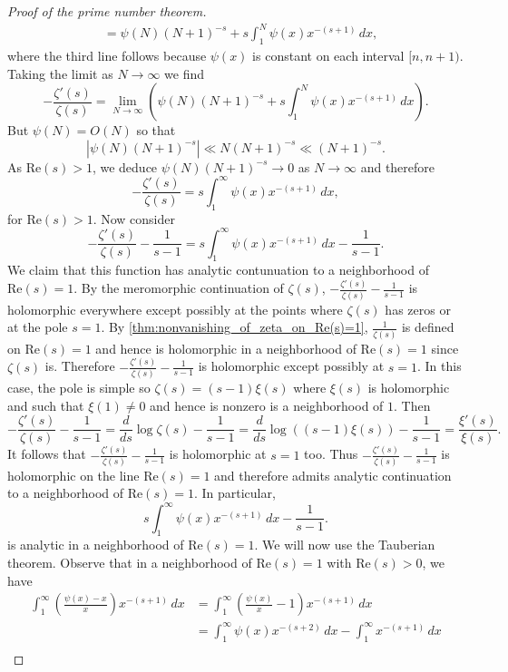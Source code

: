 \documentclass[12pt]{book}
\theoremstyle{definition}\newframedtheorem{method}{Method}
\newcommand{\z}{\zeta}
\newcommand{\<}{\langle}
\renewcommand{\>}{\rangle}
\renewcommand{\Re}{\mathrm{Re}}
\begin{document}
\begin{proof}[Proof of the prime number theorem]
\begin{align*}
          &= \psi(N)(N+1)^{-s}+s\int_{1}^{N}\psi(x)x^{-(s+1)}\,dx,
        \end{align*}
        where the third line follows because $\psi(x)$ is constant on each interval $[n,n+1)$. Taking the limit as $N \to \infty$ we find
        \[
          -\frac{\z'(s)}{\z(s)} = \lim_{N \to \infty}\left(\psi(N)(N+1)^{-s}+s\int_{1}^{N}\psi(x)x^{-(s+1)}\,dx\right).
        \]
        But $\psi(N) = O(N)$ so that
        \[
          |\psi(N)(N+1)^{-s}| \ll N(N+1)^{-s} \ll (N+1)^{-s}.
        \]
        As $\Re(s) > 1$, we deduce $\psi(N)(N+1)^{-s} \to 0$ as $N \to \infty$ and therefore
        \[
          -\frac{\z'(s)}{\z(s)} = s\int_{1}^{\infty}\psi(x)x^{-(s+1)}\,dx,
        \]
        for $\Re(s) > 1$. Now consider
        \[
          -\frac{\z'(s)}{\z(s)}-\frac{1}{s-1} = s\int_{1}^{\infty}\psi(x)x^{-(s+1)}\,dx-\frac{1}{s-1}.
        \]
        We claim that this function has analytic contunuation to a neighborhood of $\Re(s) = 1$. By the meromorphic continuation of $\z(s)$, $-\frac{\z'(s)}{\z(s)}-\frac{1}{s-1}$ is holomorphic everywhere except possibly at the points where $\z(s)$ has zeros or at the pole $s = 1$. By \cref{thm:nonvanishing_of_zeta_on_Re(s)=1}, $\frac{1}{\z(s)}$ is defined on $\Re(s) = 1$ and hence is holomorphic in a neighborhood of $\Re(s) = 1$ since $\z(s)$ is. Therefore $-\frac{\z'(s)}{\z(s)}-\frac{1}{s-1}$ is holomorphic except possibly at $s = 1$. In this case, the pole is simple so $\z(s) = (s-1)\xi(s)$ where $\xi(s)$ is holomorphic and such that $\xi(1) \neq 0$ and hence is nonzero is a neighborhood of $1$. Then
        \[
          -\frac{\z'(s)}{\z(s)}-\frac{1}{s-1} = \frac{d}{ds}\log\z(s)-\frac{1}{s-1} = \frac{d}{ds}\log((s-1)\xi(s))-\frac{1}{s-1} = \frac{\xi'(s)}{\xi(s)}.
        \]
        It follows that $-\frac{\z'(s)}{\z(s)}-\frac{1}{s-1}$ is holomorphic at $s = 1$ too. Thus $-\frac{\z'(s)}{\z(s)}-\frac{1}{s-1}$ is holomorphic on the line $\Re(s) = 1$ and therefore admits analytic continuation to a neighborhood of $\Re(s) = 1$. In particular,
        \[
          s\int_{1}^{\infty}\psi(x)x^{-(s+1)}\,dx-\frac{1}{s-1}.
        \]
        is analytic in a neighborhood of $\Re(s) = 1$. We will now use the Tauberian theorem. Observe that in a neighborhood of $\Re(s) = 1$ with $\Re(s) > 0$, we have
        \begin{align*}
          \int_{1}^{\infty}\left(\frac{\psi(x)-x}{x}\right)x^{-(s+1)}\,dx &= \int_{1}^{\infty}\left(\frac{\psi(x)}{x}-1\right)x^{-(s+1)}\,dx \\
          &= \int_{1}^{\infty}\psi(x)x^{-(s+2)}\,dx-\int_{1}^{\infty}x^{-(s+1)}\,dx \\

\end{align*}
\end{proof}
\end{document}
